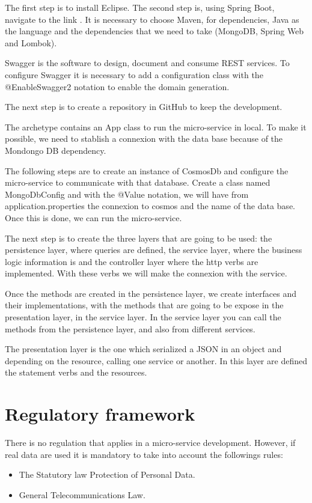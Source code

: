\documentclass[12pt]{report} %
\begin{document}
The first step is to install Eclipse. The second step is, using Spring Boot, navigate to the link \cite{startSpring}. It is necessary to choose Maven, for dependencies, Java as the language and the dependencies that we need to take (MongoDB, Spring Web and Lombok).

Swagger is the software to design, document and consume REST services. To configure Swagger it is necessary to add a configuration class with the @EnableSwagger2 notation to enable the domain generation.

The next step is to create a repository in GitHub \cite{repositorio} to keep the development.

The archetype contains an App class to run the micro-service in local. To make it possible, we need to stablish a connexion with the data base because of the Mondongo DB dependency.

The following steps are to create an instance of CosmosDb and configure the micro-service to communicate with that database. Create a class named MongoDbConfig and with the @Value notation, we will have from application.properties the connexion to cosmos and the name of the data base. Once this is done, we can run the micro-service.

The next step is to create the three layers that are going to be used: the persistence layer, where queries are defined, the service layer, where the business logic information is and the controller layer where the http verbs are implemented. With these verbs we will make the connexion with the service.

Once the methods are created in the persistence layer, we create interfaces and their implementations, with the methods that are going to be expose in the presentation layer, in the service layer.
In the service layer you can call the methods from the persistence layer, and also from different services.

The presentation layer is the one which serialized a JSON in an object and depending on the resource, calling one service or another. In this layer are defined the statement verbs and the resources.

\section{Regulatory framework}

There is no regulation that applies in a micro-service development. However, if real data are used it is mandatory to take into account the followings rules:
\begin{itemize}
	\item The Statutory law Protection of Personal Data.
	\item General Telecommunications Law.
\end{itemize}
\end{document}
